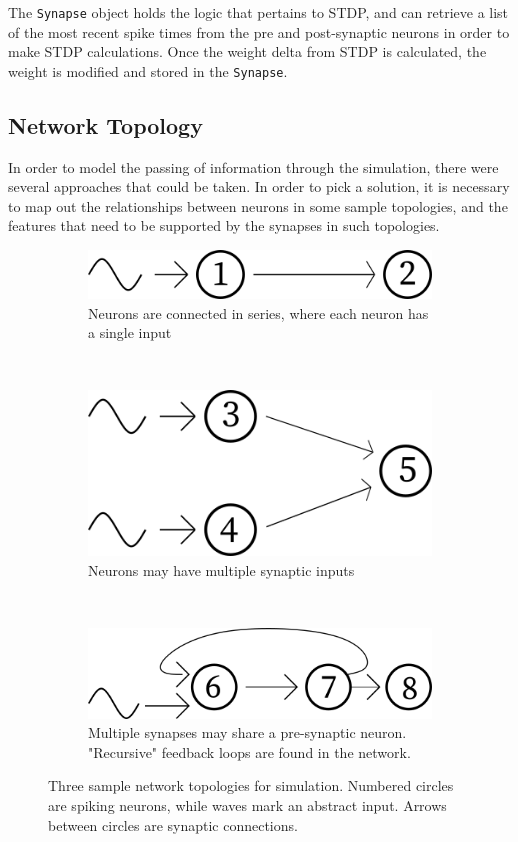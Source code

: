 The \texttt{Synapse} object holds the logic that pertains to STDP, and can
retrieve a list of the most recent spike times from the pre and post-synaptic
neurons in order to make STDP calculations. Once the weight delta from STDP is
calculated, the weight is modified and stored in the \texttt{Synapse}.

\FloatBarrier

\subsection{Network Topology}

In order to model the passing of information through the simulation, there were
several approaches that could be taken. In order to pick a solution, it is
necessary to map out the relationships between neurons in some sample topologies,
and the features that need to be supported by the synapses in such topologies. 


\begin{figure}[h!]
    \begin{subfigure}{1\textwidth}
        \centering
        \includegraphics[width=0.35\linewidth]{figures/tops/top1.png}
        \caption{Neurons are connected in series, where each neuron has a single input}
        \label{fig:top1}
    \end{subfigure} \vspace{1ex} \\ 
    \begin{subfigure}{1\textwidth}
        \centering
        \includegraphics[width=0.35\linewidth]{figures/tops/top2.png}
        \caption{Neurons may have multiple synaptic inputs}
        \label{fig:top2}
    \end{subfigure} \vspace{1ex} \\
    \begin{subfigure}{1\textwidth}
        \centering
        \includegraphics[width=0.35\linewidth]{figures/tops/top3.png}
        \caption{Multiple synapses may share a pre-synaptic neuron. "Recursive" feedback loops are found in the network.}
        \label{fig:top3}
    \end{subfigure}
    \caption[Sample network topologies for simulation]{Three sample network topologies for simulation. Numbered circles are spiking neurons, while waves mark an abstract input. Arrows between circles are synaptic connections.}
    \label{fig:tops}
\end{figure}

